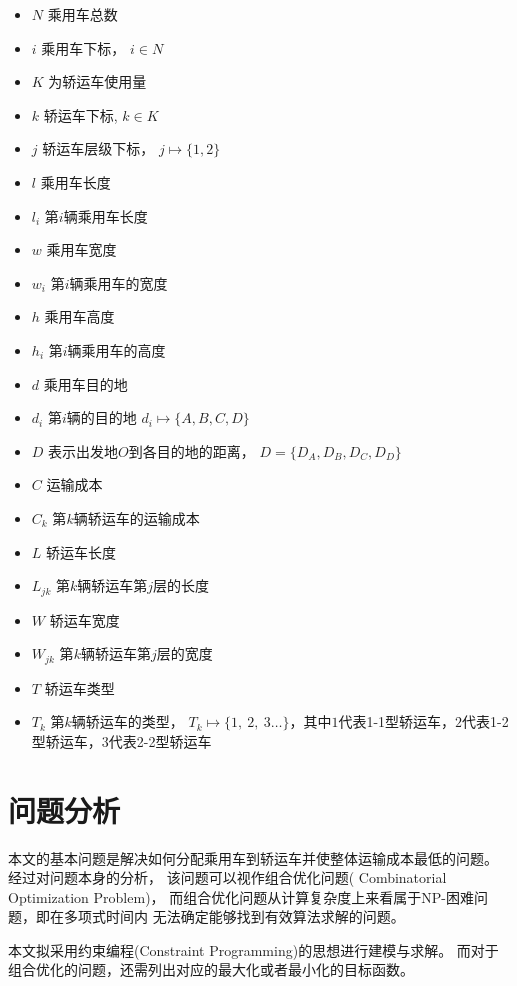 \documentclass[UTF8]{ctexart}
\begin{document}
	\begin{itemize}
		\item $N$ 乘用车总数
		\item $i$ 乘用车下标， $i \in N$
		\item $K$ 为轿运车使用量
		\item $k$ 轿运车下标,  $k \in K$
		\item $j$ 轿运车层级下标， $j \mapsto \{1,2\}$
		\item $l$ 乘用车长度
		\item $l_i$ 第$i$辆乘用车长度
		\item $w$ 乘用车宽度
		\item $w_i$ 第$i$辆乘用车的宽度
		\item $h$ 乘用车高度
		\item $h_i$ 第$i$辆乘用车的高度
		\item $d$ 乘用车目的地
		\item $d_i$ 第$i$辆的目的地 $d_i \mapsto \{A, B, C, D\}$
		\item $D$ 表示出发地$O$到各目的地的距离， $D=\{D_A, D_B, D_C, D_D\}$
		\item $C$ 运输成本
		\item $C_k$ 第$k$辆轿运车的运输成本
		\item $L$ 轿运车长度
		\item $L_{jk}$ 第$k$辆轿运车第$j$层的长度
		\item $W$ 轿运车宽度
		\item $W_{jk}$ 第$k$辆轿运车第$j$层的宽度
		\item $T$ 轿运车类型
		\item $T_k$ 第$k$辆轿运车的类型， $T_k \mapsto \{1, ~2, ~3 \dots \}$，其中$1$代表1-1型轿运车，$2$代表1-2型轿运车，$3$代表2-2型轿运车
		
		
	\end{itemize}


\section{问题分析}
本文的基本问题是解决如何分配乘用车到轿运车并使整体运输成本最低的问题。
经过对问题本身的分析，
该问题可以视作组合优化问题( Combinatorial Optimization Problem)，
而组合优化问题从计算复杂度上来看属于NP-困难问题，即在多项式时间内
无法确定能够找到有效算法求解的问题。

本文拟采用约束编程(Constraint Programming)的思想进行建模与求解。
而对于组合优化的问题，还需列出对应的最大化或者最小化的目标函数。
\end{document}
